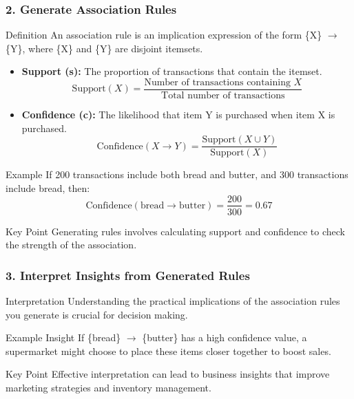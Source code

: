 \documentclass[aspectratio=169]{beamer}
\begin{document}
\begin{frame}[fragile]
    \frametitle{2. Generate Association Rules}
    \begin{block}{Definition}
        An association rule is an implication expression of the form \{X\} $\rightarrow$ \{Y\}, where \{X\} and \{Y\} are disjoint itemsets.
    \end{block}
    \begin{itemize}
        \item \textbf{Support (s):} The proportion of transactions that contain the itemset.
            \begin{equation}
                \text{Support}(X) = \frac{\text{Number of transactions containing } X}{\text{Total number of transactions}}
            \end{equation}
        \item \textbf{Confidence (c):} The likelihood that item Y is purchased when item X is purchased.
            \begin{equation}
                \text{Confidence}(X \rightarrow Y) = \frac{\text{Support}(X \cup Y)}{\text{Support}(X)}
            \end{equation}
    \end{itemize}
    \begin{exampleblock}{Example}
        If 200 transactions include both bread and butter, and 300 transactions include bread, then:
        \begin{equation}
            \text{Confidence}(\text{bread} \rightarrow \text{butter}) = \frac{200}{300} = 0.67
        \end{equation}
    \end{exampleblock}
    \begin{block}{Key Point}
        Generating rules involves calculating support and confidence to check the strength of the association.
    \end{block}
\end{frame}

\begin{frame}[fragile]
    \frametitle{3. Interpret Insights from Generated Rules}
    \begin{block}{Interpretation}
        Understanding the practical implications of the association rules you generate is crucial for decision making.
    \end{block}
    \begin{exampleblock}{Example Insight}
        If \{bread\} $\rightarrow$ \{butter\} has a high confidence value, a supermarket might choose to place these items closer together to boost sales.
    \end{exampleblock}
    \begin{block}{Key Point}
        Effective interpretation can lead to business insights that improve marketing strategies and inventory management.
    \end{block}
\end{frame}
\end{document}
